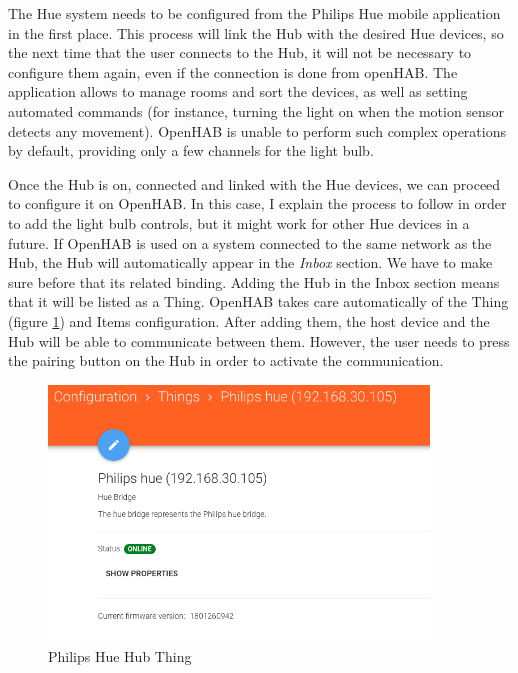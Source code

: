 The Hue system needs to be configured from the Philips Hue mobile application in the first place. This process will link the Hub with the 
desired Hue devices, so the next time that the user connects to the Hub, it will not be necessary to configure them again, even if 
the connection is done from openHAB. The application allows to manage rooms and sort the devices, as well as setting automated commands 
(for instance, turning the light on when the motion sensor detects any movement). OpenHAB is unable to perform such complex operations 
by default, providing only a few channels for the light bulb.

Once the Hub is on, connected and linked with the Hue devices, we can proceed to configure it on OpenHAB. In this case, I explain 
the process to follow in order to add the light bulb controls, but it might work for other Hue devices in a future. If OpenHAB is 
used on a system connected to the same network as the Hub, the Hub will automatically appear in the \textit{Inbox} section. We have 
to make sure before that its related binding. Adding the Hub in the Inbox section means that it will be listed as a Thing. OpenHAB 
takes care automatically of the Thing (figure \ref{fig:philips-hue-hub-thing}) and Items configuration. After adding them, the host 
device and the Hub will be able to communicate between them. However, the user needs to press the pairing button on the Hub in 
order to activate the communication.

\begin{figure}
	\centering
	\includegraphics[width=0.9\textwidth]{images/Chapter_06/philips-hue-hub-thing.png}
	\caption{Philips Hue Hub Thing}
	\label{fig:philips-hue-hub-thing}
\end{figure}


